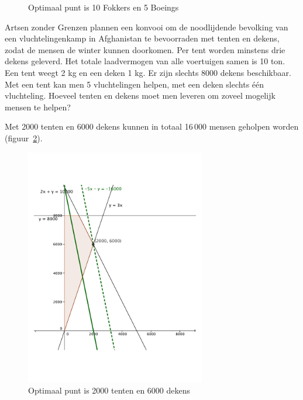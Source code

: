\begin{oef}
\begin{opl}
\begin{figure}[hbtp]
\caption{Optimaal punt is 10 Fokkers en 5 Boeings}
\label{fig:deptjaar}
\end{figure}
    \clearpage
    \end{opl}
\end{oef}      

\begin{oef}
Artsen zonder Grenzen plannen een konvooi om de
     noodlijdende bevolking van een vluchtelingenkamp in Afghanistan te 
     bevoorraden met tenten en dekens, zodat de mensen de winter kunnen 
     doorkomen. Per tent worden minstens drie dekens geleverd. Het totale laadvermogen van alle voertuigen samen is 
     10 ton. Een tent weegt 2 kg en een deken 1 kg. Er zijn slechts 8000 dekens beschikbaar. Met een tent kan men 
     5 vluchtelingen helpen, met een deken slechts \'{e}\'{e}n 
     vluchteling. Hoeveel tenten en dekens moet men leveren om zoveel 
     mogelijk mensen te helpen? 
     \begin{opl}
     Met 2000 tenten en 6000 dekens kunnen in totaal 16\,000 mensen geholpen worden (figuur~\ref{fig:AZG}).
                   \begin{figure}[hbtp]
\centering
\includegraphics[width=0.7\textwidth]{oefeningen/FigurenLP/OefAZG.pdf}
\caption{Optimaal punt is 2000 tenten en 6000 dekens}
\label{fig:AZG}
\end{figure}
     \end{opl}
\end{oef}
     

